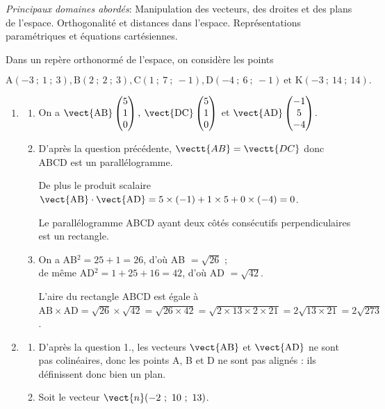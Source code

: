 \medskip

\emph{Principaux domaines abordés}: Manipulation des vecteurs, des droites et des plans de l'espace. Orthogonalité et distances dans l'espace.
Représentations paramétriques et équations cartésiennes.

\bigskip

Dans un repère orthonormé \Oijk{} de l'espace,
on considère les points 

\[\text{A}(-3~;~1~;~3), \text{B}(2~;~2~;~3), \text{C}(1~;~7~;~-1), \text{D}(-4~;~6~;~-1)\: \text{et 
K}(-3~;~14~;~14).\]



\begin{enumerate}
\item 
	\begin{enumerate}
		\item 
On a $\vect{\text{AB}}\begin{pmatrix}5\\1\\0\end{pmatrix}, \: \vect{\text{DC}}\begin{pmatrix}5\\1\\0\end{pmatrix}$ et $\vect{\text{AD}}\begin{pmatrix}-1\\5\\-4\end{pmatrix}$.
		\item
D'après la question précédente, $\vectt{AB}=\vectt{DC}$ donc ABCD est un parallélogramme.

De plus le produit scalaire $\vect{\text{AB}} \cdot \vect{\text{AD}} = 5\times(-1) + 1\times 5 + 0\times(-4) = 0$.

Le parallélogramme ABCD ayant deux côtés consécutifs perpendiculaires est un rectangle.

		\item 
On a AB$^2 = 25 + 1 = 26$, d'où AB $= \sqrt{26}$ ; \\
de même AD$^2 =  1  + 25 + 16= 42$, d'où AD $= \sqrt{42}$.

L'aire du rectangle ABCD est égale à \\
$\text{AB} \times \text{AD} = \sqrt{26 }\times\sqrt{42} = \sqrt{26 \times 42} = \sqrt{2 \times 13 \times 2 \times 21} = 2\sqrt{13 \times 21} = 2\sqrt{273}$.
	\end{enumerate}
\item 
	\begin{enumerate}
		\item 
D'après la question 1., les vecteurs $\vect{\text{AB}}$ et $\vect{\text{AD}}$ ne sont pas colinéaires, donc les points A, B et D ne sont pas alignés : ils définissent donc bien un plan.
		\item Soit le vecteur $\vect{n}(-2~;~10~;~13)$.
		

\end{enumerate}
\end{enumerate}
